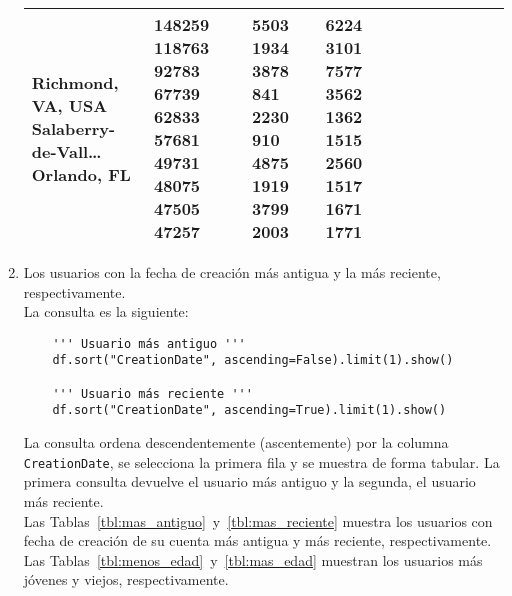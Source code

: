 \documentclass[12pt,a4paper,twoside,openright,titlepage,final]{article}
\begin{document}
\begin{enumerate}
\begin{longtable}[]{@{}lllllllllll@{}}
\begin{minipage}[t]{0.11\columnwidth}
			Richmond, VA, USA Salaberry-de-Vall\ldots{} Orlando, FL
			\strut\end{minipage} &
		\begin{minipage}[t]{0.06\columnwidth}\raggedright\strut
			148259 118763 92783 67739 62833 57681 49731 48075 47505 47257
			\strut\end{minipage} &
		\begin{minipage}[t]{0.04\columnwidth}\raggedright\strut
			5503 1934 3878 841 2230 910 4875 1919 3799 2003
			\strut\end{minipage} &
		\begin{minipage}[t]{0.04\columnwidth}\raggedright\strut
			6224 3101 7577 3562 1362 1515 2560 1517 1671 1771
			\strut\end{minipage}\tabularnewline
		\bottomrule
	\end{longtable}
	
	\item Los usuarios con la fecha de creación más antigua y la más reciente, respectivamente.\\
	
	La consulta es la siguiente:
	
	\begin{verbatim}
	''' Usuario más antiguo '''
	df.sort("CreationDate", ascending=False).limit(1).show()
	
	''' Usuario más reciente '''
	df.sort("CreationDate", ascending=True).limit(1).show()
	\end{verbatim}
	
	La consulta ordena descendentemente (ascentemente) por la columna \texttt{CreationDate}, se selecciona la primera fila y se muestra de forma tabular. La primera consulta devuelve el usuario más antiguo y la segunda, el usuario más reciente.\\
	
	Las Tablas~\ref{tbl:mas_antiguo}~y~\ref{tbl:mas_reciente} muestra los usuarios con fecha de creación de su cuenta más antigua y más reciente, respectivamente.\\  
	
	Las Tablas~\ref{tbl:menos_edad}~y~\ref{tbl:mas_edad} muestran los usuarios más jóvenes y viejos, respectivamente.\\  
	

\end{enumerate}
\end{document}
